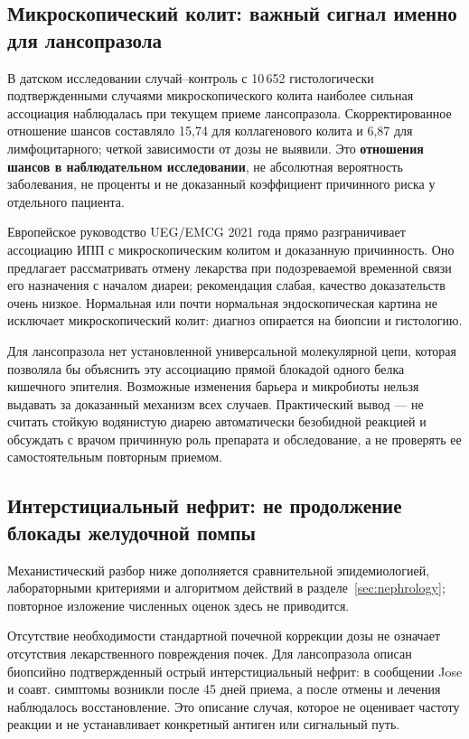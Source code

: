 \documentclass[11pt,a4paper,notitlepage]{report}
\newcommand{\src}[1]{\unskip\space\cite{#1}}
\begin{document}
\subsection{Микроскопический колит: важный сигнал именно для лансопразола}
В датском исследовании случай--контроль с 10\,652 гистологически подтвержденными случаями микроскопического колита наиболее сильная ассоциация наблюдалась при текущем приеме лансопразола. Скорректированное отношение шансов составляло 15,74 для коллагенового колита и 6,87 для лимфоцитарного; четкой зависимости от дозы не выявили. Это \textbf{отношения шансов в наблюдательном исследовании}, не абсолютная вероятность заболевания, не проценты и не доказанный коэффициент причинного риска у отдельного пациента.\src{safecolitis}

Европейское руководство UEG/EMCG 2021 года прямо разграничивает ассоциацию ИПП с микроскопическим колитом и доказанную причинность. Оно предлагает рассматривать отмену лекарства при подозреваемой временной связи его назначения с началом диареи; рекомендация слабая, качество доказательств очень низкое. Нормальная или почти нормальная эндоскопическая картина не исключает микроскопический колит: диагноз опирается на биопсии и гистологию.\src{safecolitisguide}

Для лансопразола нет установленной универсальной молекулярной цепи, которая позволяла бы объяснить эту ассоциацию прямой блокадой одного белка кишечного эпителия. Возможные изменения барьера и микробиоты нельзя выдавать за доказанный механизм всех случаев. Практический вывод --- не считать стойкую водянистую диарею автоматически безобидной реакцией и обсуждать с врачом причинную роль препарата и обследование, а не проверять ее самостоятельным повторным приемом.\src{safecolitisguide,safecolitis}

\subsection{Интерстициальный нефрит: не продолжение блокады желудочной помпы}
Механистический разбор ниже дополняется сравнительной эпидемиологией, лабораторными критериями и алгоритмом действий в разделе~\ref{sec:nephrology}; повторное изложение численных оценок здесь не приводится.

Отсутствие необходимости стандартной почечной коррекции дозы не означает отсутствия лекарственного повреждения почек. Для лансопразола описан биопсийно подтвержденный острый интерстициальный нефрит: в сообщении Jose и соавт. симптомы возникли после 45 дней приема, а после отмены и лечения наблюдалось восстановление. Это описание случая, которое не оценивает частоту реакции и не устанавливает конкретный антиген или сигнальный путь.\src{safeain}
\end{document}
